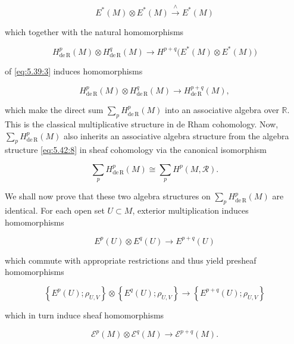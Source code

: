 \begin{equation}
\tag{1}\label{eq:5.43:1}
E^{*}(M)\otimes E^{*}(M)\xrightarrow{\wedge}E^{*}(M)
\end{equation}

which together with the natural homomorphisms

\begin{equation}
\tag{2}\label{eq:5.43:2}
H_{\mathrm{de\,R}}^{p}(M)\otimes H_{\mathrm{de\,R}}^{q}(M)\to H^{p+q}\big(E^{\ast}(M)\otimes E^{\ast}(M)\big)
\end{equation}

of \eqref{eq:5.39:3} induces homomorphisms

\begin{equation}
\tag{3}\label{eq:5.43:3}
H_{\mathrm{de\,R}}^{p}(M)\otimes H_{\mathrm{de\,R}}^{q}(M)\to H_{\mathrm{de\,R}}^{p+q}(M),
\end{equation}

which make the direct sum $\sum_{p} H_{\mathrm{de\,R}}^{p}(M)$ into an associative algebra over $\mathbb{R}$. This is the classical multiplicative structure in de Rham cohomology. Now, $\sum_{p} H_{\mathrm{de\,R}}^{p}(M)$ also inherits an associative algebra structure from the algebra structure \eqref{eq:5.42:8} in sheaf cohomology via the canonical isomorphism

\[
\sum_{p}H_{\mathrm{de\,R}}^{p}(M)\cong\sum_{p}H^{p}(M,\mathcal{R}).
\]

We shall now prove that these two algebra structures on $\sum_{p} H_{\mathrm{de\,R}}^{p}(M)$ are identical. For each open set $U \subset M$, exterior multiplication induces homomorphisms

\begin{equation}
\tag{4}\label{eq:5.43:4}
E^{p}(U)\otimes E^{q}(U)\to E^{p+q}(U)
\end{equation}

which commute with appropriate restrictions and thus yield presheaf homomorphisms

\begin{equation}
\tag{5}\label{eq:5.43:5}
\left\{E^{p}(U);\rho_{U,V}\right\}\otimes\left\{E^{q}(U);\rho_{U,V}\right\}\to\left\{E^{p+q}(U);\rho_{U,V}\right\}
\end{equation}

which in turn induce sheaf homomorphisms

\begin{equation}
\tag{6}\label{eq:5.43:6}
\mathcal{E}^{p}(M)\otimes\mathcal{E}^{q}(M)\to\mathcal{E}^{p+q}(M).
\end{equation}

